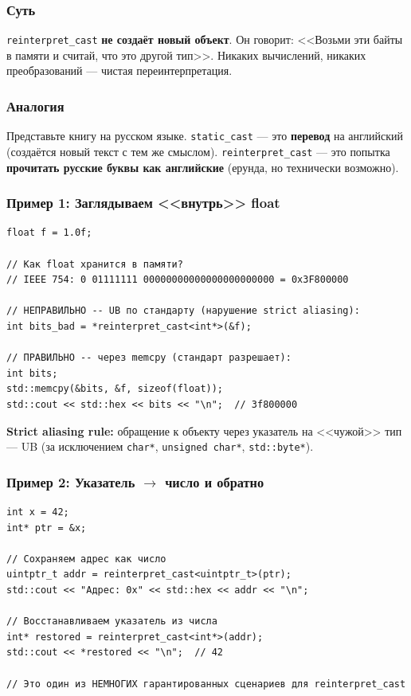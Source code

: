 \documentclass[a4paper,12pt]{article}
\begin{document}
\subsubsection{Суть}

\texttt{reinterpret\_cast} \textbf{не создаёт новый объект}. Он говорит:
<<Возьми эти байты в памяти и считай, что это другой тип>>. Никаких вычислений,
никаких преобразований --- чистая переинтерпретация.

\subsubsection{Аналогия}

Представьте книгу на русском языке. \texttt{static\_cast} --- это \textbf{перевод}
на английский (создаётся новый текст с тем же смыслом). \texttt{reinterpret\_cast} ---
это попытка \textbf{прочитать русские буквы как английские} (ерунда, но технически
возможно).

\subsubsection{Пример 1: Заглядываем <<внутрь>> float}

\begin{lstlisting}
float f = 1.0f;

// Как float хранится в памяти?
// IEEE 754: 0 01111111 00000000000000000000000 = 0x3F800000

// НЕПРАВИЛЬНО -- UB по стандарту (нарушение strict aliasing):
int bits_bad = *reinterpret_cast<int*>(&f);

// ПРАВИЛЬНО -- через memcpy (стандарт разрешает):
int bits;
std::memcpy(&bits, &f, sizeof(float));
std::cout << std::hex << bits << "\n";  // 3f800000
\end{lstlisting}

\textbf{Strict aliasing rule:} обращение к объекту через указатель на <<чужой>> тип ---
UB (за исключением \texttt{char*}, \texttt{unsigned char*}, \texttt{std::byte*}).

\subsubsection{Пример 2: Указатель $\to$ число и обратно}

\begin{lstlisting}
int x = 42;
int* ptr = &x;

// Сохраняем адрес как число
uintptr_t addr = reinterpret_cast<uintptr_t>(ptr);
std::cout << "Адрес: 0x" << std::hex << addr << "\n";

// Восстанавливаем указатель из числа
int* restored = reinterpret_cast<int*>(addr);
std::cout << *restored << "\n";  // 42

// Это один из НЕМНОГИХ гарантированных сценариев для reinterpret_cast
\end{lstlisting}
\end{document}

